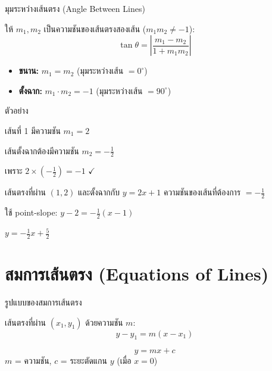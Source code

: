\documentclass[11pt, aspectratio=169]{beamer}
\begin{document}
\begin{frame}{มุมระหว่างเส้นตรง (Angle Between Lines)}
  \begin{explanation}
    ให้ $m_1, m_2$ เป็นความชันของเส้นตรงสองเส้น ($m_1m_2 \neq -1$):
    \[
      \tan \theta = \left|\frac{m_1 - m_2}{1 + m_1m_2}\right|
    \]
  \end{explanation}

  \begin{explanation}
    \begin{itemize}
      \item \textbf{ขนาน:} $m_1 = m_2$ \quad (มุมระหว่างเส้น $= 0^\circ$)
      \item \textbf{ตั้งฉาก:} $m_1 \cdot m_2 = -1$ \quad (มุมระหว่างเส้น $= 90^\circ$)
    \end{itemize}
  \end{explanation}
\end{frame}

\begin{frame}{ตัวอย่าง}
  \begin{exambox}
    เส้นที่ 1 มีความชัน $m_1 = 2$

    เส้นตั้งฉากต้องมีความชัน $m_2 = -\frac{1}{2}$

    เพราะ $2 \times (-\frac{1}{2}) = -1$ \quad $\checkmark$
  \end{exambox}

  \begin{exambox}[โจทย์]
    เส้นตรงที่ผ่าน $(1,2)$ และตั้งฉากกับ $y = 2x + 1$
    ความชันของเส้นที่ต้องการ $= -\frac{1}{2}$

    ใช้ point-slope: $y - 2 = -\frac{1}{2}(x - 1)$

    $y = -\frac{1}{2}x + \frac{5}{2}$
  \end{exambox}
\end{frame}

\section{สมการเส้นตรง (Equations of Lines)}

\begin{frame}{รูปแบบของสมการเส้นตรง}
  \begin{explanation}
    เส้นตรงที่ผ่าน $(x_1, y_1)$ ด้วยความชัน $m$:
    \[
      y - y_1 = m(x - x_1)
    \]
  \end{explanation}

  \begin{explanation}
    \[
      y = mx + c
    \]
    $m$ = ความชัน, \quad $c$ = ระยะตัดแกน $y$ (เมื่อ $x = 0$)
  \end{explanation}
\end{frame}
\end{document}
